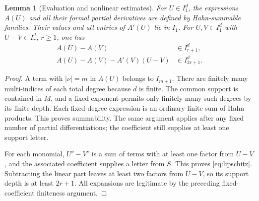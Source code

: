 \documentclass[11pt,a4paper]{article}
\newtheorem{lemma}[theorem]{Lemma}
\theoremstyle{definition}
\theoremstyle{remark}
\begin{document}
\begin{lemma}[Evaluation and nonlinear estimates]\label{lem:nonlinear}
For $U\in I_1^d$, the expressions $A(U)$ and all their formal partial
derivatives are defined by Hahn-summable families. Their values and all
entries of $A'(U)$ lie in $I_1$. For $U,V\in I_1^d$ with
$U-V\in I_r^d$, $r\ge1$, one has
\begin{align}
 A(U)-A(V)&\in I_{r+1}^d,\label{eq:lipschitz}\\
 A(U)-A(V)-A'(V)(U-V)&\in I_{2r+1}^d.\label{eq:quadratic}
\end{align}
\end{lemma}
\begin{proof}
A term with $|\nu|=m$ in $A(U)$ belongs to $I_{m+1}$. There are finitely
many multi-indices of each total degree because $d$ is finite. The common
support is contained in $M$, and a fixed exponent permits only finitely many
such degrees by its finite depth. Each fixed-degree expression is an
ordinary finite sum of Hahn products. This proves summability. The same
argument applies after any fixed number of partial differentiations;
the coefficient still supplies at least one support letter.

For each monomial, $U^\nu-V^\nu$ is a sum of terms with at least one factor
from $U-V$, and the associated coefficient supplies a letter from $S$.
This proves \eqref{eq:lipschitz}. Subtracting the linear part leaves at
least two factors from $U-V$, so its support depth is at least $2r+1$.
All expansions are legitimate by the preceding fixed-coefficient finiteness
argument.
\end{proof}
\end{document}
